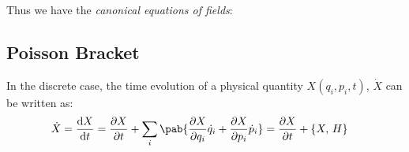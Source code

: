 Thus we have the \emph{canonical equations of fields}:

\subsection{Poisson Bracket}
In the discrete case, the time evolution of a physical quantity $X(q_i, p_i, t)$, $\dot{X}$ can be written as:
\begin{align}
  \dot{X} =  \odv{X}{t} & =\pdv{X}{t} + \sum_i \pab{\pdv{X}{q_i} \dot{q}_i + \pdv{X}{p_i} \dot{p}_i} = \pdv{X}{t} + \pobra{X}{H}
\end{align}


